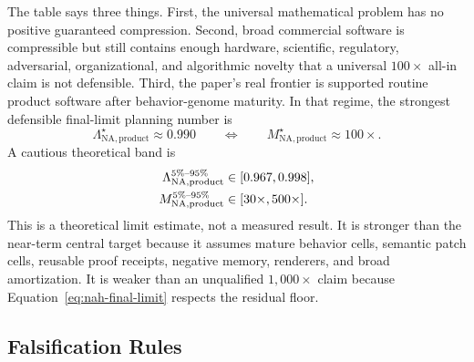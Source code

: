 The table says three things. First, the universal mathematical problem has no positive guaranteed compression. Second, broad commercial software is compressible but still contains enough hardware, scientific, regulatory, adversarial, organizational, and algorithmic novelty that a universal $100\times$ all-in claim is not defensible. Third, the paper's real frontier is supported routine product software after behavior-genome maturity. In that regime, the strongest defensible final-limit planning number is
\begin{equation}
\Lambda_{\mathrm{NA,product}}^{\star}\approx 0.990
\qquad\Longleftrightarrow\qquad
M_{\mathrm{NA,product}}^{\star}\approx 100\times .
\label{eq:nah-product-star}
\end{equation}
A cautious theoretical band is
\begin{align}
\Lambda_{\mathrm{NA,product}}^{5\%\text{--}95\%}
&\in[0.967,0.998], \notag\\
M_{\mathrm{NA,product}}^{5\%\text{--}95\%}
&\in[30\times,500\times].
\label{eq:nah-product-band}
\end{align}
This is a theoretical limit estimate, not a measured result. It is stronger than the near-term central target because it assumes mature behavior cells, semantic patch cells, reusable proof receipts, negative memory, renderers, and broad amortization. It is weaker than an unqualified $1{,}000\times$ claim because Equation~\ref{eq:nah-final-limit} respects the residual floor.

\subsection{Falsification Rules}

